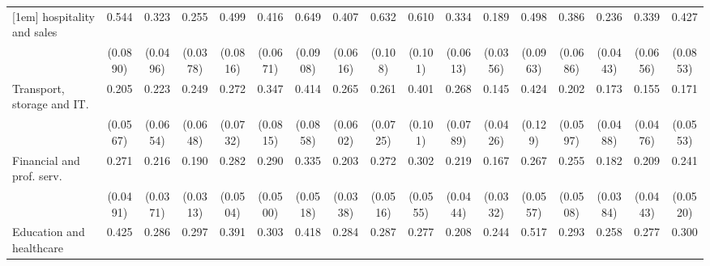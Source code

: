 {\begin{tabular}{l*{16}{c}}
[1em]
hospitality and sales&       0.544\sym{***}&       0.323\sym{***}&       0.255\sym{***}&       0.499\sym{***}&       0.416\sym{***}&       0.649\sym{**} &       0.407\sym{***}&       0.632\sym{**} &       0.610\sym{**} &       0.334\sym{***}&       0.189\sym{***}&       0.498\sym{***}&       0.386\sym{***}&       0.236\sym{***}&       0.339\sym{***}&       0.427\sym{***}\\
                    &    (0.0890)         &    (0.0496)         &    (0.0378)         &    (0.0816)         &    (0.0671)         &    (0.0908)         &    (0.0616)         &     (0.108)         &     (0.101)         &    (0.0613)         &    (0.0356)         &    (0.0963)         &    (0.0686)         &    (0.0443)         &    (0.0656)         &    (0.0853)         \\
[1em]
Transport, storage and IT.&       0.205\sym{***}&       0.223\sym{***}&       0.249\sym{***}&       0.272\sym{***}&       0.347\sym{***}&       0.414\sym{***}&       0.265\sym{***}&       0.261\sym{***}&       0.401\sym{***}&       0.268\sym{***}&       0.145\sym{***}&       0.424\sym{**} &       0.202\sym{***}&       0.173\sym{***}&       0.155\sym{***}&       0.171\sym{***}\\
                    &    (0.0567)         &    (0.0654)         &    (0.0648)         &    (0.0732)         &    (0.0815)         &    (0.0858)         &    (0.0602)         &    (0.0725)         &     (0.101)         &    (0.0789)         &    (0.0426)         &     (0.129)         &    (0.0597)         &    (0.0488)         &    (0.0476)         &    (0.0553)         \\
[1em]
Financial and prof. serv.&       0.271\sym{***}&       0.216\sym{***}&       0.190\sym{***}&       0.282\sym{***}&       0.290\sym{***}&       0.335\sym{***}&       0.203\sym{***}&       0.272\sym{***}&       0.302\sym{***}&       0.219\sym{***}&       0.167\sym{***}&       0.267\sym{***}&       0.255\sym{***}&       0.182\sym{***}&       0.209\sym{***}&       0.241\sym{***}\\
                    &    (0.0491)         &    (0.0371)         &    (0.0313)         &    (0.0504)         &    (0.0500)         &    (0.0518)         &    (0.0338)         &    (0.0516)         &    (0.0555)         &    (0.0444)         &    (0.0332)         &    (0.0557)         &    (0.0508)         &    (0.0384)         &    (0.0443)         &    (0.0520)         \\
[1em]
Education and healthcare&       0.425\sym{***}&       0.286\sym{***}&       0.297\sym{***}&       0.391\sym{***}&       0.303\sym{***}&       0.418\sym{***}&       0.284\sym{***}&       0.287\sym{***}&       0.277\sym{***}&       0.208\sym{***}&       0.244\sym{***}&       0.517\sym{**} &       0.293\sym{***}&       0.258\sym{***}&       0.277\sym{***}&       0.300\sym{***}\\

\end{tabular}}
